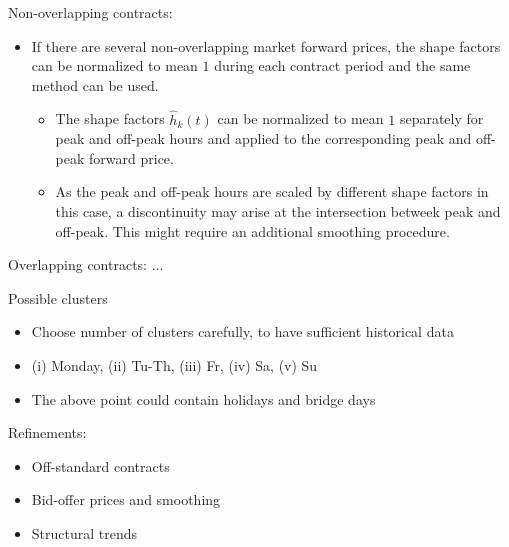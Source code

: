 \documentclass{beamer}
\begin{document}
\begin{frame}
    Non-overlapping contracts:
    \begin{itemize}
        \item If there are several non-overlapping market forward prices, the shape factors can be normalized to mean $1$ during each contract period and the same method can be used.

              \begin{itemize}
                  \item The shape factors $\hat h_k(t)$ can be normalized to mean $1$ separately for peak and off-peak hours and applied to the corresponding peak and off-peak forward price.

                  \item As the peak and off-peak hours are scaled by different shape factors in this case, a discontinuity may arise at the intersection betweek peak and off-peak. This might require an additional smoothing procedure.
              \end{itemize}
    \end{itemize}
\end{frame}


\begin{frame}
    Overlapping contracts: ...
\end{frame}


\begin{frame}
    Possible clusters
    \begin{itemize}
        \item Choose number of clusters carefully, to have sufficient historical data

        \item (i) Monday, (ii) Tu-Th, (iii) Fr, (iv) Sa, (v) Su

        \item The above point could contain holidays and bridge days
    \end{itemize}
\end{frame}


\begin{frame}
    Refinements:
    \begin{itemize}
        \item Off-standard contracts
        \item Bid-offer prices and smoothing
        \item Structural trends
    \end{itemize}
\end{frame}


\nocite{*}

\end{document}
